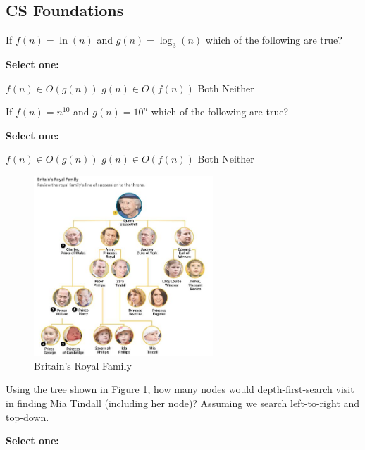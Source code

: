 \documentclass[11pt,addpoints,answers]{exam}
\numberwithin{equation}{section} %
\numberwithin{figure}{section} %
\numberwithin{table}{section} %
\begin{document}
\subsection{CS Foundations}
\begin{questions}
    \question[1] If $f(n)=\ln(n)$ and $g(n)=\log_3(n)$ which of the following are true?

    \textbf{Select one:}
    \begin{checkboxes}
        \choice $f(n) \in O(g(n))$
        \choice $g(n) \in O(f(n))$
        \choice Both 
        \choice Neither
    \end{checkboxes}


    \question[1] If $f(n)=n^{10}$ and $g(n)=10^n$ which of the following are true?

    \textbf{Select one:}
    \begin{checkboxes}
        \choice $f(n) \in O(g(n))$
        \choice $g(n) \in O(f(n))$
        \choice Both
        \choice Neither
    \end{checkboxes}


    \begin{figure}[H]
        \centering
        \includegraphics[width=0.6\textwidth]{BritiansRoyalFamily.jpg}
        \caption{Britain's Royal Family}
        \label{fig:family}
    \end{figure}
    \clearpage
    \question[2] Using the tree shown in Figure \ref{fig:family}, how many nodes would depth-first-search visit in finding Mia Tindall (including her node)? Assuming we search left-to-right and top-down.

    \textbf{Select one:}
    \begin{checkboxes}
    \end{checkboxes}


\end{questions}
\end{document}
